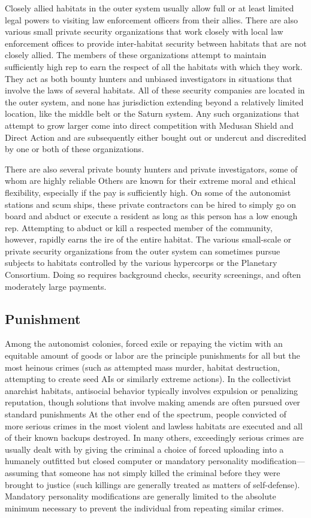 Closely allied habitats in the outer system usually 
allow full or at least limited legal powers to visiting 
law enforcement officers from their allies. There are 
also various small private security organizations that 
work closely with local law enforcement offices  to 
provide inter-habitat security between habitats that 
are not closely allied. The members of these organizations
attempt to maintain sufficiently high rep to
earn the respect of all the habitats with which they 
work. They act as both bounty hunters and unbiased 
investigators in situations that involve the laws of 
several habitats. All of these security companies are 
located in the outer system, and none has jurisdiction 
extending beyond a relatively limited location, like 
the middle belt or the Saturn system. Any such organizations
that attempt to grow larger come into direct
competition with Medusan Shield and Direct Action 
and are subsequently either bought out or undercut 
and discredited by one or both of these organizations.

There are also several private bounty hunters and 
private investigators, some of whom are highly reliable
Others are known for their extreme moral and
ethical flexibility, especially if the pay is sufficiently 
high. On some of the autonomist stations and scum 
ships, these private contractors can be hired to simply 
go on board and abduct or execute a resident as long 
as this person has a low enough rep. Attempting to 
abduct or kill a respected member of the community, 
however, rapidly earns the ire of the entire habitat. 
The various small-scale or private security organizations
from the outer system can sometimes pursue
subjects to habitats controlled by the various hypercorps
or the Planetary Consortium. Doing so requires
background checks, security screenings, and often 
moderately large payments.

\subsection{Punishment}

Among the autonomist colonies, forced exile or repaying
the victim with an equitable amount of goods or
labor are the principle punishments for all but the most 
heinous crimes (such as attempted mass murder, habitat 
destruction, attempting to create seed AIs or similarly 
extreme actions). In the collectivist anarchist habitats, 
antisocial behavior typically involves expulsion or 
penalizing reputation, though solutions that involve 
making amends are often pursued over standard punishments
At the other end of the spectrum, people convicted
of more serious crimes in the most violent and
lawless habitats are executed and all of their known 
backups destroyed. In many others, exceedingly serious 
crimes are usually dealt with by giving the criminal a 
choice of forced uploading into a humanely outfitted 
but closed computer or mandatory personality modification—assuming
that someone has not simply killed
the criminal before they were brought to justice (such 
killings are generally treated as matters of self-defense). 
Mandatory personality modifications are generally 
limited to the absolute minimum necessary to prevent 
the individual from repeating similar crimes.


